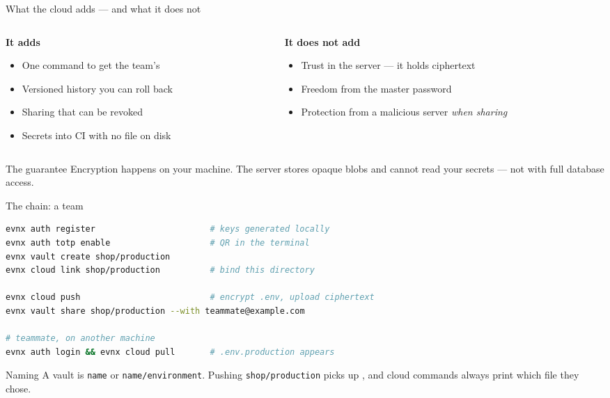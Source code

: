 \documentclass[aspectratio=169,10pt]{beamer}
\begin{document}
\begin{frame}{What the cloud adds --- and what it does not}
  \begin{columns}[T]
    \begin{column}{0.48\textwidth}
      \textbf{It adds}
      \begin{itemize}\footnotesize
        \item One command to get the team's 
        \item Versioned history you can roll back
        \item Sharing that can be revoked
        \item Secrets into CI with no file on disk
      \end{itemize}
    \end{column}
    \begin{column}{0.48\textwidth}
      \textbf{It does not add}
      \begin{itemize}\footnotesize
        \item Trust in the server --- it holds ciphertext
        \item Freedom from the master password
        \item Protection from a malicious server \emph{when sharing}
      \end{itemize}
    \end{column}
  \end{columns}

  \vspace{0.8em}
  \begin{block}{The guarantee}
    Encryption happens on your machine. The server stores opaque blobs and
    cannot read your secrets --- not with full database access.
  \end{block}
\end{frame}

\begin{frame}[fragile]{The chain: a team}
\begin{lstlisting}[style=evnxcode,language=bash]
evnx auth register                       # keys generated locally
evnx auth totp enable                    # QR in the terminal
evnx vault create shop/production
evnx cloud link shop/production          # bind this directory

evnx cloud push                          # encrypt .env, upload ciphertext
evnx vault share shop/production --with teammate@example.com

# teammate, on another machine
evnx auth login && evnx cloud pull       # .env.production appears
\end{lstlisting}

  \begin{block}{Naming}
    A vault is \texttt{name} or \texttt{name/environment}. Pushing
    \texttt{shop/production} picks up , and cloud commands
    always print which file they chose.
  \end{block}
\end{frame}
\end{document}
